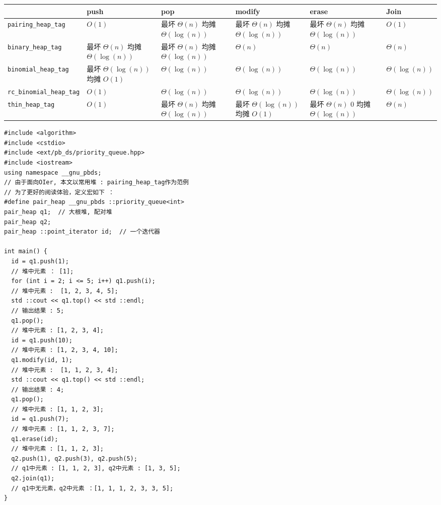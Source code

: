 \documentclass[]{article}
\begin{document}
\begin{longtable}[]{@{}lp{2cm}p{2cm}p{2cm}p{2cm}p{2cm}@{}}
\toprule()
& push & pop & modify & erase & Join \\
\midrule()
\endhead
\texttt{pairing\_heap\_tag} & \(O(1)\) & 最坏 \(\Theta(n)\)  均摊
\(\Theta(\log(n))\) & 最坏 \(\Theta(n)\) 均摊 \(\Theta(\log(n))\) & 最坏
\(\Theta(n)\) 均摊 \(\Theta(\log(n))\) & \(O(1)\) \\ \midrule
\texttt{binary\_heap\_tag} & 最坏 \(\Theta(n)\) 均摊 \(\Theta(\log(n))\)
& 最坏 \(\Theta(n)\) 均摊 \(\Theta(\log(n))\) & \(\Theta(n)\) &
\(\Theta(n)\) & \(\Theta(n)\) \\ \midrule
\texttt{binomial\_heap\_tag} & 最坏 \(\Theta(\log(n))\) 均摊 \(O(1)\) &
\(\Theta(\log(n))\) & \(\Theta(\log(n))\) & \(\Theta(\log(n))\) &
\(\Theta(\log(n))\) \\\midrule
\texttt{rc\_binomial\_heap\_tag} & \(O(1)\) & \(\Theta(\log(n))\) &
\(\Theta(\log(n))\) & \(\Theta(\log(n))\) & \(\Theta(\log(n))\) \\ \midrule
\texttt{thin\_heap\_tag} & \(O(1)\) & 最坏 \(\Theta(n)\) 均摊
\(\Theta(\log(n))\) & 最坏 \(\Theta(\log(n))\) 均摊 \(O(1)\) & 最坏
\(\Theta(n)\) 0 均摊 \(\Theta(\log(n))\) & \(\Theta(n)\) \\
\bottomrule()
\end{longtable}

\begin{verbatim}
#include <algorithm>
#include <cstdio>
#include <ext/pb_ds/priority_queue.hpp>
#include <iostream>
using namespace __gnu_pbds;
// 由于面向OIer, 本文以常用堆 : pairing_heap_tag作为范例
// 为了更好的阅读体验，定义宏如下 ：
#define pair_heap __gnu_pbds ::priority_queue<int>
pair_heap q1;  // 大根堆, 配对堆
pair_heap q2;
pair_heap ::point_iterator id;  // 一个迭代器

int main() {
  id = q1.push(1);
  // 堆中元素 ： [1];
  for (int i = 2; i <= 5; i++) q1.push(i);
  // 堆中元素 :  [1, 2, 3, 4, 5];
  std ::cout << q1.top() << std ::endl;
  // 输出结果 : 5;
  q1.pop();
  // 堆中元素 : [1, 2, 3, 4];
  id = q1.push(10);
  // 堆中元素 : [1, 2, 3, 4, 10];
  q1.modify(id, 1);
  // 堆中元素 :  [1, 1, 2, 3, 4];
  std ::cout << q1.top() << std ::endl;
  // 输出结果 : 4;
  q1.pop();
  // 堆中元素 : [1, 1, 2, 3];
  id = q1.push(7);
  // 堆中元素 : [1, 1, 2, 3, 7];
  q1.erase(id);
  // 堆中元素 : [1, 1, 2, 3];
  q2.push(1), q2.push(3), q2.push(5);
  // q1中元素 : [1, 1, 2, 3], q2中元素 : [1, 3, 5];
  q2.join(q1);
  // q1中无元素，q2中元素 ：[1, 1, 1, 2, 3, 3, 5];
}
\end{verbatim}
\end{document}
